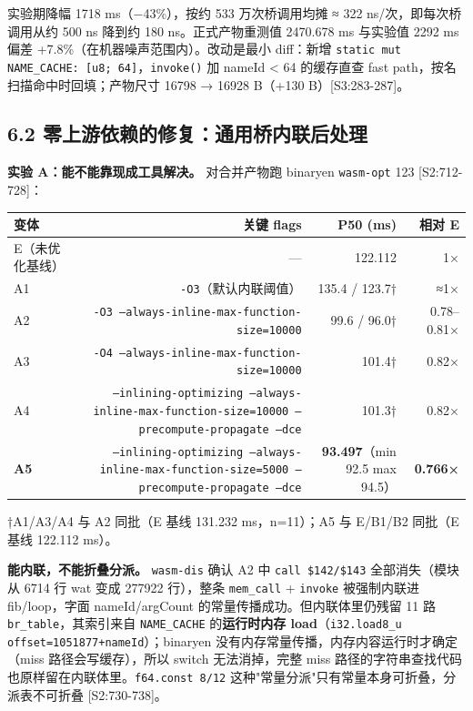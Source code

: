 \documentclass[11pt, a4paper]{article}
\begin{document}
实验期降幅 1718 ms（−43\%），按约 533 万次桥调用均摊 ≈ 322 ns/次，即每次桥调用从约 500 ns 降到约 180 ns。正式产物重测值 2470.678 ms 与实验值 2292 ms 偏差 +7.8\%（在机器噪声范围内）。改动是最小 diff：新增 \texttt{static mut NAME\_CACHE: [u8; 64]}，\texttt{invoke()} 加 nameId < 64 的缓存直查 fast path，按名扫描命中时回填；产物尺寸 16798 → 16928 B（+130 B）[S3:283-287]。


\subsection{6.2 零上游依赖的修复：通用桥内联后处理}

\textbf{实验 A：能不能靠现成工具解决。} 对合并产物跑 binaryen \texttt{wasm-opt} 123 [S2:712-728]：


\begin{center}\small\begin{tabular}{lrrr}
\toprule
变体 & 关键 flags & P50 (ms) & 相对 E \\
\midrule
E（未优化基线） & — & 122.112 & 1× \\
A1 & \texttt{-O3}（默认内联阈值） & 135.4 / 123.7† & ≈1× \\
A2 & \texttt{-O3 --always-inline-max-function-size=10000} & 99.6 / 96.0† & 0.78–0.81× \\
A3 & \texttt{-O4 --always-inline-max-function-size=10000} & 101.4† & 0.82× \\
A4 & \texttt{--inlining-optimizing --always-inline-max-function-size=10000 --precompute-propagate --dce} & 101.3† & 0.82× \\
\textbf{A5} & \texttt{--inlining-optimizing --always-inline-max-function-size=5000 --precompute-propagate --dce} & \textbf{93.497}（min 92.5 max 94.5） & \textbf{0.766×} \\
\bottomrule
\end{tabular}\end{center}


†A1/A3/A4 与 A2 同批（E 基线 131.232 ms，n=11）；A5 与 E/B1/B2 同批（E 基线 122.112 ms）。


\textbf{能内联，不能折叠分派。} \texttt{wasm-dis} 确认 A2 中 \texttt{call \$142/\$143} 全部消失（模块从 6714 行 wat 变成 277922 行），整条 \texttt{mem\_call} + \texttt{invoke} 被强制内联进 fib/loop，字面 nameId/argCount 的常量传播成功。但内联体里仍残留 11 路 \texttt{br\_table}，其索引来自 \texttt{NAME\_CACHE} 的\textbf{运行时内存 load}（\texttt{i32.load8\_u offset=1051877+nameId}）；binaryen 没有内存常量传播，内存内容运行时才确定（miss 路径会写缓存），所以 switch 无法消掉，完整 miss 路径的字符串查找代码也原样留在内联体里。\texttt{f64.const 8/12} 这种"常量分派"只有常量本身可折叠，分派表不可折叠 [S2:730-738]。
\end{document}
